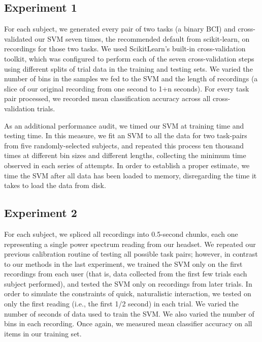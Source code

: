 
\subsection{Experiment 1}

For each subject, we generated every pair of two tasks (a binary BCI) and cross-validated our SVM seven times, the recommended default from scikit-learn, on recordings for those two tasks. We used ScikitLearn's built-in cross-validation toolkit, which was configured to perform each of the seven cross-validation steps using different splits of trial data in the training and testing sets. We varied the number of bins in the samples we fed to the SVM and the length of recordings (a slice of our original recording from one second to 1+n seconds). For every task pair processed, we recorded mean classification accuracy across all cross-validation trials.

As an additional performance audit, we timed our SVM at training time and testing time. In this measure, we fit an SVM to all the data for two task-pairs from five randomly-selected subjects, and repeated this process ten thousand times at different bin sizes and different lengths, collecting the minimum time observed in each series of attempts. In order to establish a proper estimate, we time the SVM after all data has been loaded to memory, disregarding the time it takes to load the data from disk.

\subsection{Experiment 2}

For each subject, we spliced all recordings into 0.5-second chunks, each one representing a single power spectrum reading from our headset. We repeated our previous calibration routine of testing all possible task pairs; however, in contrast to our methods in the last experiment, we trained the SVM only on the first recordings from each user (that is, data collected from the first few trials each subject performed), and tested the SVM only on recordings from later trials. In order to simulate the constraints of quick, naturalistic interaction, we tested on only the first reading (i.e., the first 1/2 second) in each trial. We varied the number of seconds of data used to train the SVM. We also varied the number of bins in each recording. Once again, we measured mean classifier accuracy on all items in our training set.